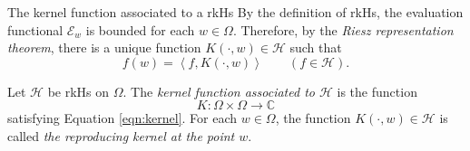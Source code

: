 \documentclass{beamer}
\newcommand{\C}{\mathbb C}
\newcommand{\calE}{{\mathcal E}}
\newcommand{\calH}{{\mathcal H}}
\newcommand{\ip}[1]{\left\langle #1 \right\rangle}
\begin{document}
\begin{frame}{The kernel function associated to a rkHs}
By the definition of rkHs, the evaluation functional $\calE_{w}$ is bounded for each $w\in \Omega$. Therefore, by the \textit{Riesz representation theorem}, there is a unique function $K\left( \cdot ,w \right) \in \calH$ such that 
\begin{equation}
f(w)=\ip{f, K\left( \cdot , w \right)} \qquad \left( f \in \calH \right).
\label{eqn:kernel}
\end{equation}


\pause
\begin{definition}
Let $\calH$ be rkHs on $\Omega$. The \textit{kernel function associated to $\calH$} is the function
\begin{equation*}
K : \Omega \times \Omega \to \C
\end{equation*}
satisfying Equation \ref{eqn:kernel}. For each $w\in \Omega$, the function $K\left( \cdot , w \right) \in \calH$ is called \textit{the reproducing kernel at the point $w$}.
\label{def:kernel-function}
\end{definition}
\end{frame}
\end{document}
